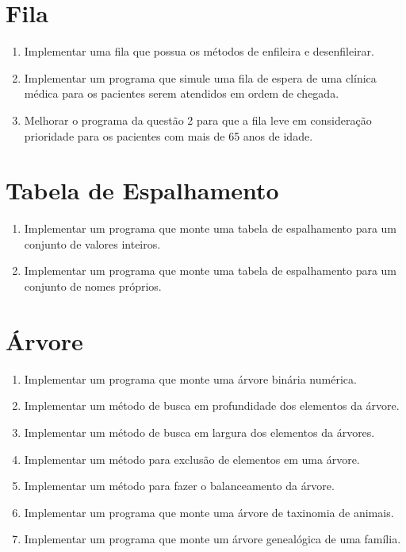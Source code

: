 \documentclass[11pt]{article}
\begin{document}
\newpage
\section{Fila}

\begin{enumerate}
	
	\item Implementar uma fila que possua os métodos de enfileira e desenfileirar.
	
	\item Implementar um programa que  simule uma fila de espera de uma clínica médica para os pacientes serem atendidos em ordem de chegada.
	
	\item Melhorar o programa da questão 2 para que a fila leve em consideração prioridade para os pacientes com mais de 65 anos de idade.
\end{enumerate}

\newpage
\section{Tabela de Espalhamento}

\begin{enumerate}
	\item Implementar um programa que monte uma tabela de espalhamento para um conjunto de valores inteiros.
	
	\item Implementar um programa que monte uma tabela de espalhamento para um conjunto de nomes próprios.
\end{enumerate}

\newpage
\section{Árvore}

\begin{enumerate}
	
	\item Implementar um programa que monte uma árvore binária numérica.
	
	\item Implementar um método de busca em profundidade dos elementos da árvore.
	
	\item Implementar um método de busca em largura dos elementos da árvores.
	
	\item Implementar um método para exclusão de elementos em uma árvore. 
	
	\item Implementar um método para fazer o balanceamento da árvore.
	
	\item Implementar um programa que monte uma árvore de taxinomia de animais.
	
	\item Implementar um programa que monte um árvore genealógica de uma família.
	
\end{enumerate}
\end{document}
